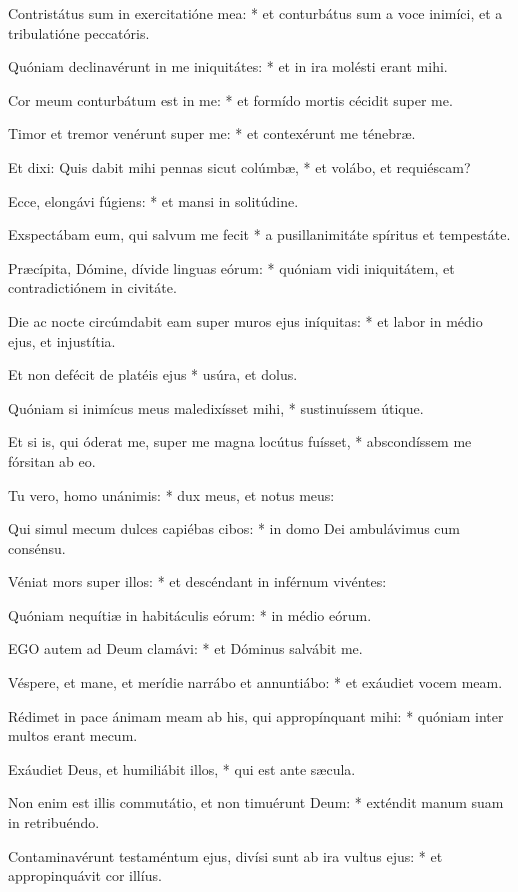 Contristátus sum in exercitatióne mea: * et conturbátus sum a voce inimíci, et a tribulatióne peccatóris.

Quóniam declinavérunt in me iniquitátes: * et in ira molésti erant mihi.

Cor meum conturbátum est in me: * et formído mortis cécidit super me.

Timor et tremor venérunt super me: * et contexérunt me ténebræ.

Et dixi: Quis dabit mihi pennas sicut colúmbæ, * et volábo, et requiéscam?

Ecce, elongávi fúgiens: * et mansi in solitúdine.

Exspectábam eum, qui salvum me fecit * a pusillanimitáte spíritus et tempestáte.

Præcípita, Dómine, dívide linguas eórum: * quóniam vidi iniquitátem, et contradictiónem in civitáte.

Die ac nocte circúmdabit eam super muros ejus iníquitas: * et labor in médio ejus, et injustítia.

Et non defécit de platéis ejus * usúra, et dolus.

Quóniam si inimícus meus maledixísset mihi, * sustinuíssem útique.

Et si is, qui óderat me, super me magna locútus fuísset, * abscondíssem me fórsitan ab eo.

Tu vero, homo unánimis: * dux meus, et notus meus:

Qui simul mecum dulces capiébas cibos: * in domo Dei ambulávimus cum consénsu.

Véniat mors super illos: * et descéndant in inférnum vivéntes:

Quóniam nequítiæ in habitáculis eórum: * in médio eórum.


\lettrine[lines=2]{E}{GO} autem ad Deum clamávi: * et Dóminus salvábit me.

Véspere, et mane, et merídie narrábo et annuntiábo: * et exáudiet vocem meam.

Rédimet in pace ánimam meam ab his, qui appropínquant mihi: * quóniam inter multos erant mecum.

Exáudiet Deus, et humiliábit illos, * qui est ante sæcula.

Non enim est illis commutátio, et non timuérunt Deum: * exténdit manum suam in retribuéndo.

Contaminavérunt testaméntum ejus, divísi sunt ab ira vultus ejus: * et appropinquávit cor illíus.

